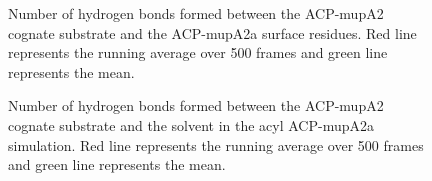\begin{singlespacing}
		\setlength\fboxsep{5pt}
		\setlength\fboxrule{1.5pt}
		\begin{figure}[htbp]
		\centering
		\caption[Number of hydrogen bonds formed between the ACP-mupA2 cognate substrate and the ACP-mupA2a surface residues over time.]{Number of hydrogen bonds formed between the ACP-mupA2 cognate substrate and the ACP-mupA2a surface residues.  Red line represents the running average over 500 frames and green line represents the mean.}
		\label{fig:HbondACP2_protein}
		\end{figure}

		\setlength\fboxsep{5pt}
		\setlength\fboxrule{1.5pt}
		\begin{figure}[htbp]
		\centering
		\caption[Number of hydrogen bonds formed between the ACP-mupA2 cognate substrate and the solvent in the acyl ACP-mupA2a simulation.]{Number of hydrogen bonds formed between the ACP-mupA2 cognate substrate and the solvent in the acyl ACP-mupA2a simulation.  Red line represents the running average over 500 frames and green line represents the mean.}
		\label{fig:HbondACP2_solvent}
		\end{figure}


\end{singlespacing}
